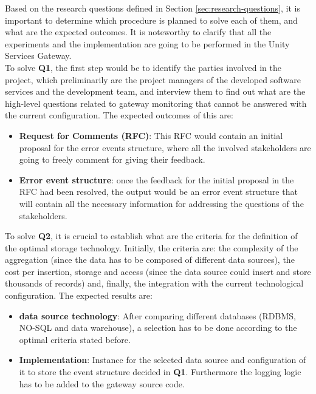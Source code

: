 \documentclass[12pt]{article}
\begin{document}
Based on the research questions defined in Section \ref{sec:research-questions}, it is important to determine which procedure is planned to solve each of them, and what are the expected outcomes. It is noteworthy to clarify that all the experiments and the implementation are going to be performed in the Unity Services Gateway.\\

To solve \textbf{Q1}, the first step would be to identify the parties involved in the project, which preliminarily are the project managers of the developed software services and the development team, and interview them to find out what are the high-level questions related to gateway monitoring that cannot be answered with the current configuration. The expected outcomes of this are:

\begin{itemize}
    \item \textbf{Request for Comments (RFC)}: This RFC would contain an initial proposal for the error events structure, where all the involved stakeholders are going to freely comment for giving their feedback.
    \item \textbf{Error event structure}: once the feedback for the initial proposal in the RFC had been resolved, the output would be an error event structure that will contain all the necessary information for addressing the questions of the stakeholders.
\end{itemize}

To solve \textbf{Q2}, it is crucial to establish what are the criteria for the definition of the optimal storage technology. Initially, the criteria are: the complexity of the aggregation (since the data has to be composed of different data sources), the cost per insertion, storage and access (since the data source could insert and store thousands of records) and, finally, the integration with the current technological configuration. The expected results are:

\begin{itemize}
    \item \textbf{data source technology}: After comparing different databases (RDBMS, NO-SQL and data warehouse), a selection has to be done according to the optimal criteria stated before.
    \item \textbf{Implementation}: Instance for the selected data source and configuration of it to store the event structure decided in \textbf{Q1}. Furthermore the logging logic has to be added to the gateway source code.
\end{itemize}
\end{document}
